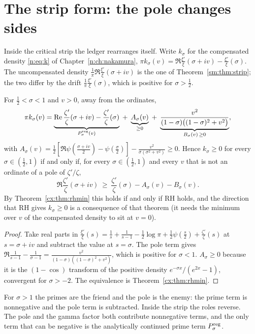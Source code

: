 \section{The strip form: the pole changes sides}\label{g:sec:strip}

Inside the critical strip the ledger rearranges itself. Write $k_\sigma$ for the compensated density \eqref{n:eq:k} of Chapter~\ref{n:ch:nakamura}, $\pi k_\sigma(v)=\Re\frac{\xi'}{\xi}(\sigma+iv)-\frac{\xi'}{\xi}(\sigma)$. The uncompensated density $\frac1\pi\Re\frac{\xi'}{\xi}(\sigma+iv)$ is the one of Theorem~\ref{sm:thm:strip}; the two differ by the drift $\frac1\pi\frac{\xi'}{\xi}(\sigma)$, which is positive for $\sigma>\frac12$.

\begin{theorem}\label{g:thm:strip}
For $\frac12<\sigma<1$ and $v>0$, away from the ordinates,
\[
\pi k_\sigma(v)=\underbrace{\Re\frac{\zeta'}{\zeta}(\sigma+iv)-\frac{\zeta'}{\zeta}(\sigma)}_{P^{\rm reg}_\sigma(v)}\;+\;\underbrace{A_\sigma(v)}_{\ge0}\;+\;\underbrace{\frac{v^2}{(1-\sigma)\big((1-\sigma)^2+v^2\big)}}_{B_\sigma(v)\,\ge0},
\]
with $A_\sigma(v)=\frac12[\Re\psi(\frac{\sigma+iv}2)-\psi(\frac\sigma2)]-\frac{v^2}{\sigma(\sigma^2+v^2)}\ge0$. Hence $k_\sigma\ge0$ for every $\sigma\in(\frac12,1)$ if and only if, for every $\sigma\in(\frac12,1)$ and every $v$ that is not an ordinate of a pole of $\zeta'/\zeta$,
\begin{equation}\label{g:eq:stripineq}
\Re\frac{\zeta'}{\zeta}(\sigma+iv)\ \ge\ \frac{\zeta'}{\zeta}(\sigma)-A_\sigma(v)-B_\sigma(v).
\end{equation}
By Theorem~\ref{cx:thm:rhmin} this holds if and only if RH holds, and the direction that RH gives $k_\sigma\ge0$ is a consequence of that theorem (it needs the minimum over $v$ of the compensated density to sit at $v=0$).
\end{theorem}

\begin{proof}
Take real parts in $\frac{\xi'}{\xi}(s)=\frac1s+\frac1{s-1}-\frac12\log\pi+\frac12\psi(\frac s2)+\frac{\zeta'}{\zeta}(s)$ at $s=\sigma+iv$ and subtract the value at $s=\sigma$. The pole term gives $\Re\frac1{s-1}-\frac1{\sigma-1}=\frac{v^2}{(1-\sigma)((1-\sigma)^2+v^2)}$, which is positive for $\sigma<1$. $A_\sigma\ge0$ because it is the $(1-\cos)$ transform of the positive density $e^{-\sigma x}/(e^{2x}-1)$, convergent for $\sigma>-2$. The equivalence is Theorem~\ref{cx:thm:rhmin}.
\end{proof}

For $\sigma>1$ the primes are the friend and the pole is the enemy: the prime term is nonnegative and the pole term is subtracted. Inside the strip the roles reverse. The pole and the gamma factor both contribute nonnegative terms, and the only term that can be negative is the analytically continued prime term $P^{\rm reg}_\sigma$.

